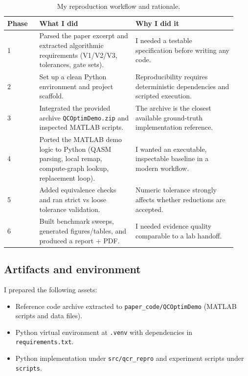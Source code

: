 \documentclass[11pt,a4paper]{article}
\begin{document}
\begin{table}[H]
\centering
\caption{My reproduction workflow and rationale.}
\label{tab:workflow}
\begin{tabular}{p{0.13\linewidth}p{0.39\linewidth}p{0.41\linewidth}}
\toprule
Phase & What I did & Why I did it \\
\midrule
1 & Parsed the paper excerpt and extracted algorithmic requirements (V1/V2/V3, tolerances, gate sets). & I needed a testable specification before writing any code. \\
2 & Set up a clean Python environment and project scaffold. & Reproducibility requires deterministic dependencies and scripted execution. \\
3 & Integrated the provided archive \texttt{QCOptimDemo.zip} and inspected MATLAB scripts. & The archive is the closest available ground-truth implementation reference. \\
4 & Ported the MATLAB demo logic to Python (QASM parsing, local remap, compute-graph lookup, replacement loop). & I wanted an executable, inspectable baseline in a modern workflow. \\
5 & Added equivalence checks and ran strict vs loose tolerance validation. & Numeric tolerance strongly affects whether reductions are accepted. \\
6 & Built benchmark sweeps, generated figures/tables, and produced a report + PDF. & I needed evidence quality comparable to a lab handoff. \\
\bottomrule
\end{tabular}
\end{table}

\subsection{Artifacts and environment}
I prepared the following assets:
\begin{itemize}
    \item Reference code archive extracted to \texttt{paper\_code/QCOptimDemo} (MATLAB scripts and data files).
    \item Python virtual environment at \texttt{.venv} with dependencies in \texttt{requirements.txt}.
    \item Python implementation under \texttt{src/qcr\_repro} and experiment scripts under \texttt{scripts}.
\end{itemize}
\end{document}
